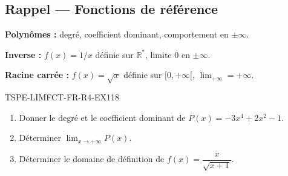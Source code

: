 

\subsection*{Rappel — Fonctions de référence}

\textbf{Polynômes :} degré, coefficient dominant, comportement en $\pm\infty$.

\textbf{Inverse :} $f(x) = 1/x$ définie sur $\mathbb{R}^*$, limite $0$ en $\pm\infty$.

\textbf{Racine carrée :} $f(x) = \sqrt{x}$ définie sur $[0, +\infty[$, $\lim_{+\infty} = +\infty$.

\begin{exercice}{TSPE-LIMFCT-FR-R4-EX1}{1}{8}
\begin{enumerate}
  \item Donner le degré et le coefficient dominant de $P(x) = -3x^4 + 2x^2 - 1$.
  \item Déterminer $\lim_{x \to +\infty} P(x)$.
  \item Déterminer le domaine de définition de $f(x) = \dfrac{x}{\sqrt{x+1}}$.
\end{enumerate}
\end{exercice}

